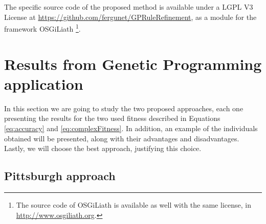 \documentclass[a4paper,10pt,twocolumn,preprint,3p]{elsarticle}
\begin{document}
The specific source code of the proposed method is available under a LGPL V3 License 
at \url{https://github.com/fergunet/GPRuleRefinement}, as a module for 
the framework OSGiLiath \cite{DBLP:journals/soco/Garcia-SanchezGCAG13} 
\footnote{The source code of OSGiLiath is available as well with the same license, in \url{http://www.osgiliath.org}.}.







\section{Results from Genetic Programming application}
\label{sec:gp}

In this section we are going to study the two proposed approaches, each one presenting the results for the two used fitness described in Equations \ref{eq:accuracy} and \ref{eq:complexFitness}. In addition, an example of the individuals obtained will be presented, along with their advantages and disadvantages. Lastly, we will choose the best approach, justifying this choice.

\subsection{Pittsburgh approach}
\end{document}
